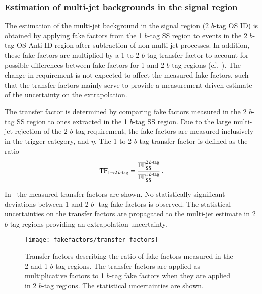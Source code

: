 \subsubsection{Estimation of multi-jet backgrounds in the signal region}

The estimation of the multi-jet background in the \hadhad signal
region (2 $b$-tag OS ID) is obtained by applying fake factors from the
1 $b$-tag SS region to events in the 2 $b$-tag OS Anti-ID region after
subtraction of non-multi-jet processes. In addition, these fake
factors are multiplied by a 1 to 2 $b$-tag transfer factor to account
for possible differences between fake factors for 1 and 2 $b$-tag
regions (cf.\ ). The change in \btag
requirement is not expected to affect the measured fake factors, such
that the transfer factors mainly serve to provide a measurement-driven
estimate of the uncertainty on the extrapolation.

The transfer factor is determined by comparing fake factors measured
in the 2 $b$-tag SS region to ones extracted in the 1 $b$-tag SS
region. Due to the large multi-jet rejection of the 2 $b$-tag
requirement, the fake factors are measured inclusively in the trigger
category, \tauhadvis \pT and \tauhadvis $\eta$. The 1 to 2 $b$-tag
transfer factor is defined as the ratio
\begin{align*}
  \text{TF}_{1 \rightarrow 2\,b\text{-tag}} = \frac{\text{FF}_{\text{SS}}^{2\,b\text{-tag}}}{\text{FF}_{\text{SS}}^{1\,b\text{-tag}}} \,\text{.}
\end{align*}

In~ the measured transfer factors
are shown. No statistically significant deviations between 1 and 2 $b$
-tag fake factors is observed. The statistical uncertainties on the
transfer factors are propagated to the multi-jet estimate in 2 $b$-tag
regions providing an extrapolation uncertainty.


\begin{figure}[htbp]
  \centering

  \texttt{[image: fakefactors/transfer\_factors]}

  \caption{Transfer factors describing the ratio of fake factors
    measured in the 2 and 1 $b$-tag regions. The transfer factors are
    applied as multiplicative factors to 1 $b$-tag fake factors when
    they are applied in 2 $b$-tag regions. The statistical
    uncertainties are shown.}
  \label{fig:mjfakes_transfer_factor}
\end{figure}

